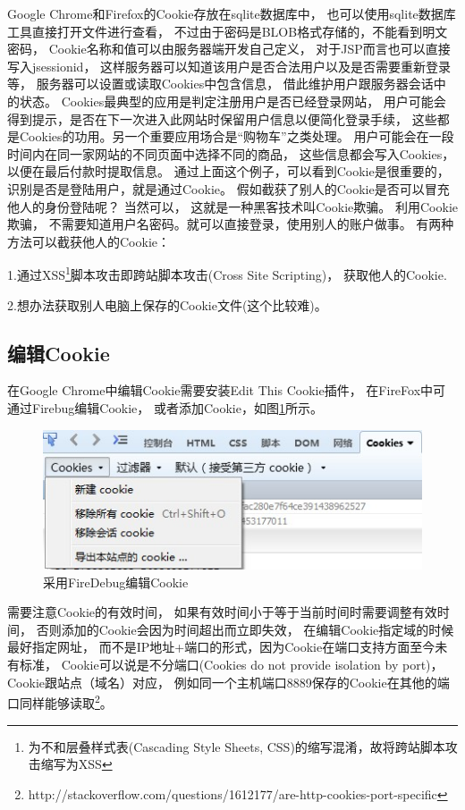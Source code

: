 \documentclass{book}
\begin{document}
Google Chrome和Firefox的Cookie存放在sqlite数据库中，
也可以使用sqlite数据库工具直接打开文件进行查看，
不过由于密码是BLOB格式存储的，不能看到明文密码，
Cookie名称和值可以由服务器端开发自己定义，
对于JSP而言也可以直接写入jsessionid，
这样服务器可以知道该用户是否合法用户以及是否需要重新登录等，
服务器可以设置或读取Cookies中包含信息，
借此维护用户跟服务器会话中的状态。
Cookies最典型的应用是判定注册用户是否已经登录网站，
用户可能会得到提示，是否在下一次进入此网站时保留用户信息以便简化登录手续，
这些都是Cookies的功用。另一个重要应用场合是“购物车”之类处理。
用户可能会在一段时间内在同一家网站的不同页面中选择不同的商品，
这些信息都会写入Cookies，以便在最后付款时提取信息。
通过上面这个例子，可以看到Cookie是很重要的，
识别是否是登陆用户，就是通过Cookie。  
假如截获了别人的Cookie是否可以冒充他人的身份登陆呢？  
当然可以， 这就是一种黑客技术叫Cookie欺骗。
利用Cookie欺骗， 不需要知道用户名密码。就可以直接登录，使用别人的账户做事。
有两种方法可以截获他人的Cookie：

1.通过XSS\footnote{为不和层叠样式表(Cascading Style Sheets,
CSS)的缩写混淆，故将跨站脚本攻击缩写为XSS}脚本攻击即跨站脚本攻击(Cross Site Scripting)，
获取他人的Cookie. 

2.想办法获取别人电脑上保存的Cookie文件(这个比较难)。

\subsection{编辑Cookie}

在Google Chrome中编辑Cookie需要安装Edit This Cookie插件，
在FireFox中可通过Firebug编辑Cookie，
或者添加Cookie，如图\ref{fig:EditCookieUsingFireDebug}所示。

\begin{figure}[htbp]
	\centering
	\includegraphics[scale=0.8]{EditCookieUsingFireFox.jpg}
	\caption{采用FireDebug编辑Cookie}
	\label{fig:EditCookieUsingFireDebug}
\end{figure}

需要注意Cookie的有效时间，
如果有效时间小于等于当前时间时需要调整有效时间，
否则添加的Cookie会因为时间超出而立即失效，
在编辑Cookie指定域的时候最好指定网址，
而不是IP地址+端口的形式，因为Cookie在端口支持方面至今未有标准，
Cookie可以说是不分端口(Cookies do not provide isolation by port)，
Cookie跟站点（域名）对应，
例如同一个主机端口8889保存的Cookie在其他的端口同样能够读取\footnote{http://stackoverflow.com/questions/1612177/are-http-cookies-port-specific}。
\end{document}
